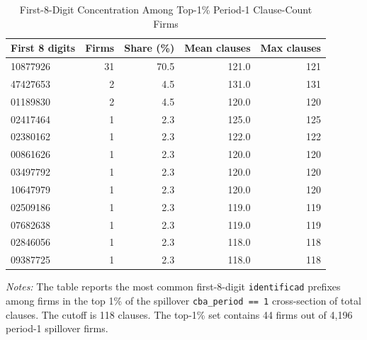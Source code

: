 \begin{table}[!htbp]
\centering
\caption{First-8-Digit Concentration Among Top-1\% Period-1 Clause-Count Firms}
\label{tab:numb_clause_outlier_prefixes}
\scriptsize
\begin{tabular}{lrrrr}
\toprule
First 8 digits & Firms & Share (\%) & Mean clauses & Max clauses \\
\midrule
10877926 & 31 & 70.5 & 121.0 & 121\\
47427653 & 2 & 4.5 & 131.0 & 131\\
01189830 & 2 & 4.5 & 120.0 & 120\\
02417464 & 1 & 2.3 & 125.0 & 125\\
02380162 & 1 & 2.3 & 122.0 & 122\\
00861626 & 1 & 2.3 & 120.0 & 120\\
03497792 & 1 & 2.3 & 120.0 & 120\\
10647979 & 1 & 2.3 & 120.0 & 120\\
02509186 & 1 & 2.3 & 119.0 & 119\\
07682638 & 1 & 2.3 & 119.0 & 119\\
02846056 & 1 & 2.3 & 118.0 & 118\\
09387725 & 1 & 2.3 & 118.0 & 118\\
\bottomrule
\end{tabular}
\begin{minipage}{\linewidth}
\footnotesize\vspace{4pt}
\textit{Notes:} The table reports the most common first-8-digit \texttt{identificad} prefixes among firms in the top 1\% of the spillover \texttt{cba\_period == 1} cross-section of total clauses. The cutoff is 118 clauses. The top-1\% set contains 44 firms out of 4{,}196 period-1 spillover firms.
\end{minipage}
\end{table}
